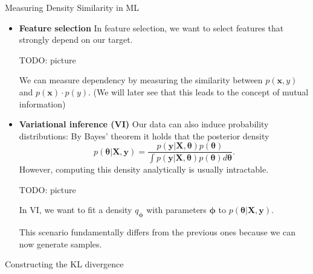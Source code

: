 \documentclass[11pt,compress,t,notes=noshow, xcolor=table]{beamer}
\begin{document}
\begin{vbframe} {Measuring Density Similarity in ML}
\begin{itemize}
    \item \textbf{Feature selection}
In feature selection, we want to select features that strongly depend on our target. 

\lz 

TODO: picture

\lz 

We can measure dependency by measuring the similarity between $p(\mathbf{x}, y)$ and $p(\mathbf{x})\cdot p(y).$ (We will later see that this leads to the concept of mutual information)

\end{itemize}

\framebreak

\begin{itemize}
    \item \textbf{Variational inference (VI)}
Our data can also induce probability distributions: By Bayes' theorem it holds that the posterior density $$p(\bm{\theta}\vert \mathbf{X}, \mathbf{y}) = \frac{p(\mathbf{y}|\mathbf{X}, \bm{\theta})p(\bm{\theta})}{\int p(\mathbf{y}|\mathbf{X}, \bm{\theta})p(\bm{\theta})d\bm{\theta}}.$$ However, computing this density analytically is usually intractable.

\lz 

TODO: picture

\lz 

In VI, we want to fit a density $q_{\bm{\phi}}$ with parameters $\bm{\phi}$ to 
    $p(\bm{\theta}\vert \mathbf{X}, \mathbf{y}).$

\lz 

This scenario fundamentally differs from the previous ones because we can now generate samples.

\end{itemize}

\end{vbframe}

\begin{vbframe}{Constructing the KL divergence}
 
\end{vbframe}

\endlecture
\end{document}
